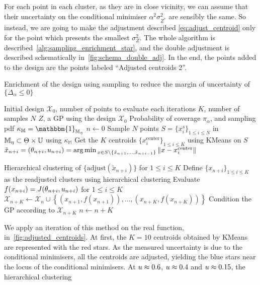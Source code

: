 \documentclass[../../Main_ManuscritThese.tex]{subfiles}
\begin{document}
For each point in each cluster, as they are in close vicinity, we can
assume that their uncertainty on the conditional minimiser
$\alpha^2\sigma^2_{Z^*}$ are sensibly the same. So instead, we are
going to make the adjustment described \cref{eq:adjust_centroid} only
for the point which presents the smallest $\sigma^2_Z$.  The whole
algorithm is described~\cref{alg:sampling_enrichment_star}, and the
double adjustment is described schematically
in~\cref{fig:schema_double_adj}. In the end, the points added to the
design are the points labeled ``Adjusted centroids 2''.



\begin{algorithm}
  \caption{Enrichment of the design using sampling to reduce the margin of uncertainty of $\{\Delta_{\alpha}\leq 0\}$}
  \label{alg:sampling_enrichment_star}
\begin{algorithmic}
  \REQUIRE Initial design $\mathcal{X}_0$, 
  \REQUIRE number of points to evaluate each iterations $K$, number of samples $N$
  \REQUIRE $Z$, a GP using the design $\mathcal{X}_0$
  \REQUIRE Probability of coverage $\pi_{\alpha}$, and sampling pdf $\kappa_{\mathbb{M}} = \mathbbm{1}_{\mathbb{M}_{\eta}}$
\STATE $n \leftarrow 0$
\STATE Sample $N$ points $S = \{x^s_i\}_{1 \leq i \leq N}$ in $\mathbb{M}_{\eta}\subset \Theta \times \mathbb{U}$ using $\kappa_{\mathbb{M}}$
\STATE Get the $K$ centroids $\{x_i^{\mathrm{center}}\}_{1 \leq i \leq K}$ using KMeans on $S$
\STATE $\tilde{x}_{n+i}=(\theta_{n+i},u_{n+i})=\operatorname*{arg\,min \,}_{x \in S \setminus \{\tilde{x}_{n+1}, \dots, \tilde{x}_{n+i-1}\}} \|x - x_i^{\mathrm{center}} \|$
\ENDFOR

\STATE Hierarchical clustering of $\{\mathrm{adjust}(\tilde{x}_{n+i})\}$ for $1 \leq i \leq K$
\STATE Define $\{x_{n+i}\}_{1\leq i\leq K}$ as the readjusted clusters using hierarchical clustering
\STATE Evaluate $f(x_{n+i})=J(\theta_{n+i},u_{n+i})$ for $1\leq i \leq K$
\STATE $\mathcal{X}_{n+K} \leftarrow \mathcal{X}_n \cup \left\{\left(x_{n+1}, f(x_{n+1})\right),\dots,  \left(x_{n+K}, f(x_{n+K})\right)\right\}$
\STATE Condition the GP according to $\mathcal{X}_{n+K}$
\STATE $n \leftarrow n + K$
\ENDWHILE
\end{algorithmic}
\end{algorithm}

We apply an iteration of this method on the real function,
in~\cref{fig:adjusted_centroids}. At first, the $K=10$ centroids
obtained by KMeans are represented with the red stars. As the measured
uncertainty is due to the conditional minimisers, all the centroids
are adjusted, yielding the blue stars near the locus of the conditional minimisers. At
$u \approx \num{0.6}$, $u\approx\num{0.4}$ and $u\approx \num{0.15}$, the hierarchical clustering
\end{document}
